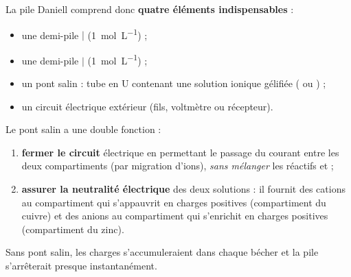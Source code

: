 \documentclass[11pt]{article}
\newcommand{\cle}[1]{{\popxbold\color{popdark}#1}}
\begin{document}
La pile Daniell comprend donc \textbf{quatre éléments indispensables} :
\begin{itemize}
\item une demi-pile  $\mid$  (\SI{1}{mol.L^{-1}}) ;
\item une demi-pile  $\mid$  (\SI{1}{mol.L^{-1}}) ;
\item un \cle{pont salin} : tube en U contenant une solution ionique gélifiée ( ou ) ;
\item un circuit électrique extérieur (fils, voltmètre ou récepteur).
\end{itemize}

\begin{definition}
Le \cle{pont salin} a une double fonction :
\begin{enumerate}
\item \textbf{fermer le circuit} électrique en permettant le passage du courant entre les deux compartiments (par migration d'ions), \emph{sans mélanger} les réactifs  et  ;
\item \textbf{assurer la neutralité électrique} des deux solutions : il fournit des cations  au compartiment qui s'appauvrit en charges positives (compartiment du cuivre) et des anions  au compartiment qui s'enrichit en charges positives (compartiment du zinc).
\end{enumerate}
Sans pont salin, les charges s'accumuleraient dans chaque bécher et la pile s'arrêterait presque instantanément.
\end{definition}
\end{document}
